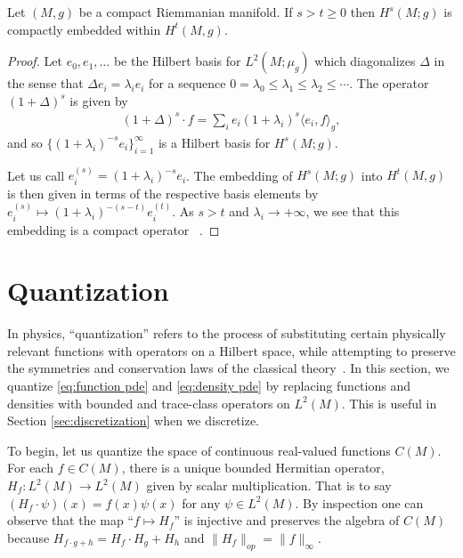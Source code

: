 \documentclass[final,leqno]{siamart}
\begin{document}
\begin{proposition} \label{prop:compact_embedding}
	Let $(M,g)$ be a compact Riemmanian manifold.  If $s > t \geq 0$ then $H^s(M;g)$ is compactly embedded within $H^t(M,g)$.
\end{proposition}
\begin{proof}
	Let $e_0, e_1,\dots$ be the Hilbert basis for $L^2(M;\mu_g)$ which diagonalizes $\Delta$
	in the sense that $\Delta e_i = \lambda_i e_i$ for a sequence $0 = \lambda_0 \leq \lambda_1 \leq \lambda_2 \leq \cdots$.
	The operator $(1+\Delta)^s$ is given by
	\begin{align}
		(1+\Delta)^s \cdot f =  \sum_{i} e_i (1+\lambda_i)^s \langle e_i , f \rangle_g,
	\end{align}
	and so $\{ (1+ \lambda_i)^{-s} e_i \}_{i=1}^{\infty}$ is a Hilbert basis for $H^s(M;g)$.
	
	Let us call $e_i^{(s)} = (1+ \lambda_i)^{-s} e_i$.
	The embedding of $H^s(M;g)$ into $H^t(M,g)$
	is then given in terms of the respective basis elements by $e_i^{(s)} \mapsto (1+\lambda_i)^{-(s-t)}e_i^{(t)}$.
	As $s > t$ and $\lambda_i \to +\infty$, we see that 
	this embedding is a compact operator ~\cite[Proposition 4.6]{Conway1990}.
\end{proof}



\section{Quantization} \label{sec:quantization}
In physics, ``quantization'' refers to the process of substituting certain physically relevant functions with operators on a Hilbert space, while attempting to preserve the symmetries and conservation laws of the classical theory~\cite{BatesWeinstein1997,Dirac2013,GuilleminSternberg1970}.
In this section, we quantize \eqref{eq:function pde} and \eqref{eq:density pde} by replacing functions and densities with bounded and trace-class operators on $L^{2}(M)$.
This is useful in Section \ref{sec:discretization} when we discretize.

To begin, let us quantize the space of continuous real-valued functions $C(M)$.
For each $f \in C(M)$, there is a unique bounded Hermitian operator, $H_{f} : L^{2}(M) \to L^{2}(M)$ given by scalar multiplication.
That is to say $(H_{f} \cdot \psi) (x) = f(x) \psi(x)$ for any $\psi \in L^{2}(M)$.
By inspection one can observe that the map ``$f \mapsto H_{f}$'' is injective and preserves the algebra of $C(M)$ because $H_{f\cdot g + h} = H_{f} \cdot H_{g} + H_{h}$ and $\| H_{f} \|_{op} = \| f \|_{\infty}$.
\end{document}
